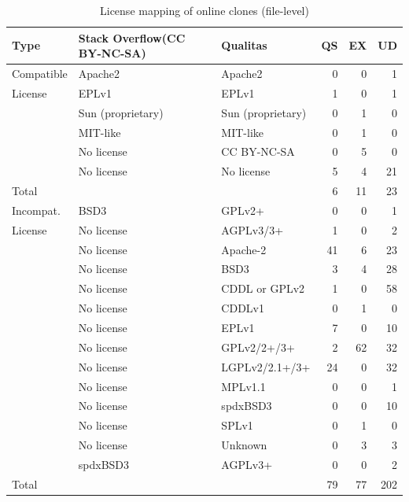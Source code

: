\documentclass[sigconf,review, anonymous]{acmart}
\begin{document}
\begin{table}[]
	\centering
	\caption{License mapping of  online clones (file-level)}
	\label{tab:license_abc}
	\footnotesize
	\begin{tabular}{l|p{1.95cm}l|rrr}
		\hline
		Type & Stack Overflow\newline (CC BY-NC-SA) & Qualitas & QS & EX & UD \\
		\hline
		Compatible & Apache2 & Apache2 &  0 & 0  & 1\\
		License	& EPLv1 & EPLv1 &  1 & 0 & 1\\
		& Sun (proprietary) & Sun (proprietary) & 0 & 1 & 0\\
		& MIT-like & MIT-like & 0 & 1 & 0\\
		& No license & CC BY-NC-SA & 0 & 5 & 0 \\
		& No license & No license & 5 & 4 & 21 \\
		\hline
		\multicolumn{3}{l|}{Total} & 6 & 11 & 23 \\
		\hline
	    Incompat. & BSD3 & GPLv2+ & 0 & 0 & 1 \\
		License	& No license & AGPLv3/3+ & 1 & 0 & 2 \\
		& No license & Apache-2 & 41 & 6 & 23 \\
		& No license & BSD3 & 3 & 4 & 28 \\
		& No license & CDDL or GPLv2 & 1 & 0 & 58 \\
		& No license & CDDLv1 & 0 & 1 & 0 \\
		& No license & EPLv1 & 7 & 0 & 10 \\
		& No license & GPLv2/2+/3+ & 2 & 62 & 32 \\
		& No license & LGPLv2/2.1+/3+ & 24 & 0 & 32 \\
		& No license & MPLv1.1 & 0 & 0 & 1 \\
		& No license & spdxBSD3 & 0 & 0 & 10 \\
		& No license & SPLv1 & 0 & 1 & 0 \\
		& No license & Unknown & 0 & 3 & 3 \\
		& spdxBSD3 & AGPLv3+ & 0 & 0 & 2 \\
		\hline
		\multicolumn{3}{l|}{Total} &  79 & 77 & 202 \\
		\hline
	\end{tabular} %
\end{table}
\end{document}
